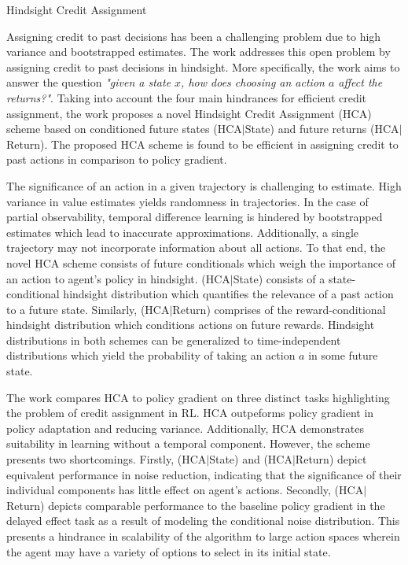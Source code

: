 \documentclass[11pt,letterpaper]{article}
\begin{document}
\begin{center}
  \large{Hindsight Credit Assignment}
\end{center}

Assigning credit to past decisions has been a challenging problem due to high variance and bootstrapped estimates. The work addresses this open problem by assigning credit to past decisions in hindsight. More specifically, the work aims to answer the question \textit{"given a state $x$, how does choosing an action $a$ affect the returns?"}. Taking into account the four main hindrances for efficient credit assignment, the work proposes a novel Hindsight Credit Assignment (HCA) scheme based on conditioned future states (HCA$|$State) and future returns (HCA$|$Return). The proposed HCA scheme is found to be efficient in assigning credit to past actions in comparison to policy gradient.

The significance of an action in a given trajectory is challenging to estimate. High variance in value estimates yields randomness in trajectories. In the case of partial observability, temporal difference learning is hindered by bootstrapped estimates which lead to inaccurate approximations. Additionally, a single trajectory may not incorporate information about all actions. To that end, the novel HCA scheme consists of future conditionals which weigh the importance of an action to agent's policy in hindsight. (HCA$|$State) consists of a state-conditional hindsight distribution which quantifies the relevance of a past action to a future state. Similarly, (HCA$|$Return) comprises of the reward-conditional hindsight distribution which conditions actions on future rewards. Hindsight distributions in both schemes can be generalized to time-independent distributions which yield the probability of taking an action $a$ in some future state. 

The work compares HCA to policy gradient on three distinct tasks highlighting the problem of credit assignment in RL. HCA outpeforms policy gradient in policy adaptation and reducing variance. Additionally, HCA demonstrates suitability in learning without a temporal component. However, the scheme presents two shortcomings. Firstly, (HCA$|$State) and (HCA$|$Return) depict equivalent performance in noise reduction, indicating that the significance of their individual components has little effect on agent's actions. Secondly, (HCA$|$Return) depicts comparable performance to the baseline policy gradient in the delayed effect task as a result of modeling the conditional noise distribution. This presents a hindrance in scalability of the algorithm to large action spaces wherein the agent may have a variety of options to select in its initial state. 
\end{document}

